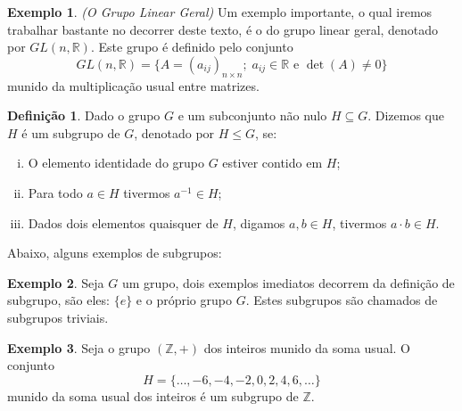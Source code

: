 \documentclass[twoside,openright,titlepage,numbers=noenddot,headinclude,  lineheaders footinclude=true,cleardoublepage=empty,
                                BCOR=5mm,paper=a4,fontsize=12pt ]{scrbook}
\theoremstyle{definition}
\newtheorem{definicao}{Definição}[chapter]
\newtheorem{exmp}{Exemplo}[section]
\begin{document}
\begin{exmp}
\textit{(O Grupo Linear Geral)} Um exemplo importante, o qual iremos trabalhar bastante no decorrer deste texto, é o do
grupo linear geral, denotado por $GL(n, \mathbb{R})$. Este grupo é definido pelo conjunto
\[ GL(n, \mathbb{R}) = \{ A = (a_{ij})_{n \times n}; \; a_{ij} \in \mathbb{R} \text{ e } \det(A) \neq 0 \}\]
munido da multiplicação usual entre matrizes. 
\end{exmp}

\begin{definicao}
Dado o grupo $G$ e um subconjunto não nulo $H \subseteq G$. Dizemos que $H$ é um subgrupo de $G$, denotado por
$H \leq G$, se:
\begin{enumerate}[(i)]
    \item O elemento identidade do grupo $G$ estiver contido em $H$;
    \item Para todo $a \in H$ tivermos $a^{-1} \in H$;
    \item Dados dois elementos quaisquer de $H$, digamos $a, b \in H$, tivermos $ a \cdot b \in H$.
\end{enumerate}
\end{definicao}

Abaixo, alguns exemplos de subgrupos:
\begin{exmp}
Seja $G$ um grupo, dois exemplos imediatos decorrem da definição de subgrupo, são eles: $\{e\}$ e o próprio
grupo $G$. Estes subgrupos são chamados de subgrupos triviais.
\end{exmp}

\begin{exmp}
Seja o grupo $(\mathbb{Z}, +)$ dos inteiros munido da soma usual. O conjunto 
\[ H = \{ \dots, -6, -4, -2, 0, 2, 4, 6, \dots \} \]
munido da soma usual dos inteiros é um subgrupo de $\mathbb{Z}$.
\end{exmp}
\end{document}
